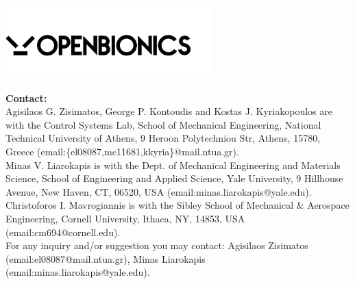 \documentclass[a4paper]{report}
\begin{document}
	\vspace{12cm}

\begin{center}
 \includegraphics[width=8cm]{figures/openbionics.png}
\end{center}

	{\Large \bfseries Contact: }\\

        \noindent Agisilaos G. Zisimatos, George P. Kontoudis and Kostas J. Kyriakopoulos are with the Control Systems Lab, School of Mechanical Engineering, National Technical University of Athens, 9 Heroon Polytechniou Str, Athens, 15780, Greece (email:\{el08087,mc11681,kkyria\}@mail.ntua.gr).\\

        \noindent Minas V. Liarokapis is with the Dept. of Mechanical Engineering and Materials Science, School of Engineering and Applied Science, Yale University, 9 Hillhouse Avenue, New Haven, CT, 06520, USA (email:minas.liarokapis@yale.edu).\\

        \noindent Christoforos I. Mavrogiannis is with the Sibley School of Mechanical \& Aerospace Engineering, Cornell University, Ithaca, NY, 14853, USA (email:cm694@cornell.edu).\\

	\noindent For any inquiry and/or suggestion you may contact: Agisilaos Zisimatos (email:el08087@mail.ntua.gr), Minas Liarokapis (email:minas.liarokapis@yale.edu). 
	

\newpage
\tableofcontents
\newpage









 

\end{document}

